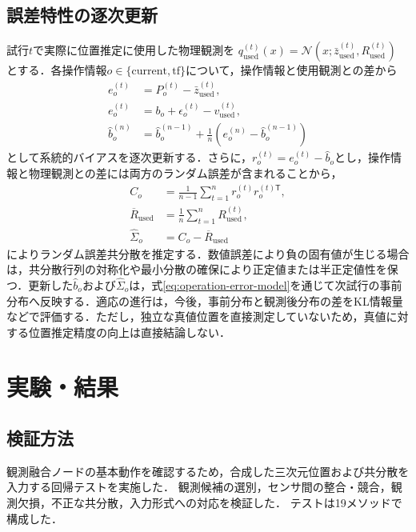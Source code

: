 \documentclass{sice-si}
\newenvironment{dotsubequations}{%
  \begin{subequations}
  \renewcommand{\theequation}{\theparentequation.\arabic{equation}}%
}{\end{subequations}}
\begin{document}
\subsection{誤差特性の逐次更新}
試行$t$で実際に位置推定に使用した物理観測を
$q_{\mathrm{used}}^{(t)}(x)=\mathcal{N}(x;\bar z_{\mathrm{used}}^{(t)},R_{\mathrm{used}}^{(t)})$
とする．各操作情報$o\in\{\mathrm{current},\mathrm{tf}\}$について，操作情報と使用観測との差から
\begin{dotsubequations}
\begin{align}
e_o^{(t)}&=P_o^{(t)}-\bar z_{\mathrm{used}}^{(t)},\\
e_o^{(t)}&=b_o+\epsilon_o^{(t)}-v_{\mathrm{used}}^{(t)},\\
\hat b_o^{(n)}
&=\hat b_o^{(n-1)}
+\frac{1}{n}\left(e_o^{(n)}-\hat b_o^{(n-1)}\right)
\label{eq:bias-update}
\end{align}
\end{dotsubequations}
として系統的バイアスを逐次更新する．さらに，$r_o^{(t)}=e_o^{(t)}-\hat b_o$とし，操作情報と物理観測との差には両方のランダム誤差が含まれることから，
\begin{dotsubequations}
\begin{align}
C_o&=\frac{1}{n-1}\sum_{t=1}^{n}r_o^{(t)}r_o^{(t)\mathsf T},\\
\overline R_{\mathrm{used}}&=\frac{1}{n}\sum_{t=1}^{n}R_{\mathrm{used}}^{(t)},\\
\hat\Sigma_o&=C_o-\overline R_{\mathrm{used}}
\label{eq:cov-update}
\end{align}
\end{dotsubequations}
によりランダム誤差共分散を推定する．数値誤差により負の固有値が生じる場合は，共分散行列の対称化や最小分散の確保により正定値または半正定値性を保つ．更新した$\hat b_o$および$\hat\Sigma_o$は，式\eqref{eq:operation-error-model}を通じて次試行の事前分布へ反映する．適応の進行は，今後，事前分布と観測後分布の差をKL情報量などで評価する．ただし，独立な真値位置を直接測定していないため，真値に対する位置推定精度の向上は直接結論しない．

\vspace{4pt}
\section{実験・結果}

\subsection{検証方法}
観測融合ノードの基本動作を確認するため，合成した三次元位置および共分散を入力する回帰テストを実施した．
観測候補の選別，センサ間の整合・競合，観測欠損，不正な共分散，入力形式への対応を検証した．
テストは19メソッドで構成した．
\end{document}
